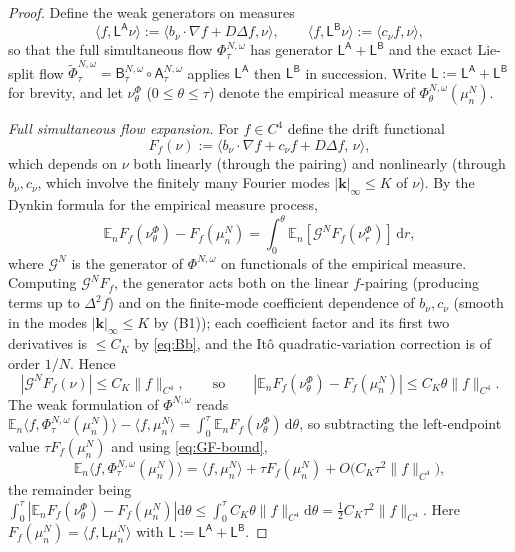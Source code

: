 \documentclass[a4paper,fleqn]{cas-sc}
\theoremstyle{definition}
\theoremstyle{remark}
\begin{document}
\begin{proof}
Define the weak generators on measures
\[
\langle f,\mathsf L^{\mathsf A}\nu\rangle:=\langle b_\nu\!\cdot\!\nabla f+D\Delta f,\nu\rangle,
\qquad
\langle f,\mathsf L^{\mathsf B}\nu\rangle:=\langle c_\nu f,\nu\rangle,
\]
so that the full simultaneous flow $\Phi^{N,\omega}_\tau$ has generator
$\mathsf L^{\mathsf A}+\mathsf L^{\mathsf B}$ and the exact Lie-split flow
$\widetilde\Phi^{N,\omega}_\tau=\mathsf B^{N,\omega}_\tau\circ\mathsf A^{N,\omega}_\tau$
applies $\mathsf L^{\mathsf A}$ then $\mathsf L^{\mathsf B}$ in succession. Write
$\mathsf L:=\mathsf L^{\mathsf A}+\mathsf L^{\mathsf B}$ for brevity, and let
$\nu^\Phi_\theta$ ($0\le\theta\le\tau$) denote the empirical measure of
$\Phi^{N,\omega}_\theta(\mu^N_n)$.

\emph{Full simultaneous flow expansion.} For $f\in C^4$ define the drift
functional
\[
F_f(\nu):=\langle b_\nu\!\cdot\!\nabla f+c_\nu f+D\Delta f,\,\nu\rangle,
\]
which depends on $\nu$ both linearly (through the pairing) and nonlinearly
(through $b_\nu,c_\nu$, which involve the finitely many Fourier modes
$|\mathbf k|_\infty\le K$ of $\nu$). By the Dynkin formula for the empirical
measure process,
\[
\mathbb E_nF_f(\nu^\Phi_\theta)-F_f(\mu^N_n)
=\int_0^\theta\mathbb E_n[\mathcal G^N F_f(\nu^\Phi_r)]\,\mathrm dr,
\]
where $\mathcal G^N$ is the generator of $\Phi^{N,\omega}$ on functionals of the
empirical measure. Computing $\mathcal G^N F_f$, the generator acts both on the
linear $f$-pairing (producing terms up to $\Delta^2 f$) and on the finite-mode
coefficient dependence of $b_\nu,c_\nu$ (smooth in the modes $|\mathbf k|_\infty
\le K$ by (B1)); each coefficient factor and its first two derivatives is
$\le C_K$ by \eqref{eq:Bb}, and the It\^o quadratic-variation correction is of
order $1/N$. Hence
\begin{equation}\label{eq:GF-bound}
|\mathcal G^N F_f(\nu)|\le C_K\|f\|_{C^4},
\qquad\text{so}\qquad
|\mathbb E_nF_f(\nu^\Phi_\theta)-F_f(\mu^N_n)|\le C_K\theta\|f\|_{C^4}.
\end{equation}
The weak formulation of $\Phi^{N,\omega}$ reads
$\mathbb E_n\langle f,\Phi^{N,\omega}_\tau(\mu^N_n)\rangle-\langle f,\mu^N_n\rangle
=\int_0^\tau\mathbb E_nF_f(\nu^\Phi_\theta)\,\mathrm d\theta$, so subtracting the
left-endpoint value $\tau F_f(\mu^N_n)$ and using \eqref{eq:GF-bound},
\begin{equation}\label{eq:Phi-exp}
\mathbb E_n\langle f,\Phi^{N,\omega}_\tau(\mu^N_n)\rangle
=\langle f,\mu^N_n\rangle+\tau F_f(\mu^N_n)
+O\bigl(C_K\tau^2\|f\|_{C^4}\bigr),
\end{equation}
the remainder being $\int_0^\tau|\mathbb E_nF_f(\nu^\Phi_\theta)-F_f(\mu^N_n)|\mathrm d\theta
\le\int_0^\tau C_K\theta\|f\|_{C^4}\mathrm d\theta=\tfrac12C_K\tau^2\|f\|_{C^4}$.
Here $F_f(\mu^N_n)=\langle f,\mathsf L\mu^N_n\rangle$ with
$\mathsf L:=\mathsf L^{\mathsf A}+\mathsf L^{\mathsf B}$.


\end{proof}
\end{document}
